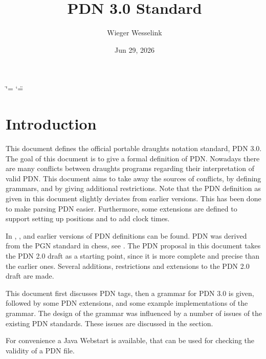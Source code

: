\documentclass[letterpaper,10pt,english]{sphinxmanual}
\title{PDN 3.0 Standard}
\date{Jun 29, 2026}
\author{Wieger Wesselink}
\begin{document}
\ifdefined\shorthandoff
  \ifnum\catcode`\=\string=\active\shorthandoff{=}\fi
  \ifnum\catcode`\"=\active{}\fi
\fi

\pagestyle{empty}
\sphinxmaketitle
\pagestyle{plain}
\sphinxtableofcontents
\pagestyle{normal}
\label{\detokenize{index::doc}}


\sphinxstepscope


\chapter{Introduction}
\label{\detokenize{introduction:introduction}}\label{\detokenize{introduction::doc}}
\sphinxAtStartPar
This document defines the official portable draughts notation standard, PDN 3.0.
The goal of this document is to give a formal definition of PDN.
Nowadays there are many conflicts between draughts programs regarding their
interpretation of valid PDN. This document aims to take away the sources of
conflicts, by defining grammars, and by giving additional restrictions. Note
that the PDN definition as given in this document slightly deviates from earlier
versions. This has been done to make parsing PDN easier. Furthermore, some
extensions are defined to support setting up positions and to add clock times.

\sphinxAtStartPar
In , ,  and  earlier versions
of PDN definitions can be found. PDN was derived from the PGN standard
in chess, see . The PDN proposal in this document takes the PDN 2.0 draft
 as a starting point, since it is more complete and precise than the
earlier ones. Several additions, restrictions and extensions to the PDN 2.0 draft
are made.

\sphinxAtStartPar
This document first discusses PDN tags, then a grammar for PDN 3.0 is given, followed
by some PDN extensions, and some example implementations of the grammar. The
design of the grammar was influenced by a number of issues of the existing
PDN standards. These issues are discussed in the {\hyperref[\detokenize{issues:issues-section}]{}} section.

\sphinxAtStartPar
For convenience a Java Webstart 
is available, that can be used for checking the validity of a PDN file.
\end{document}
